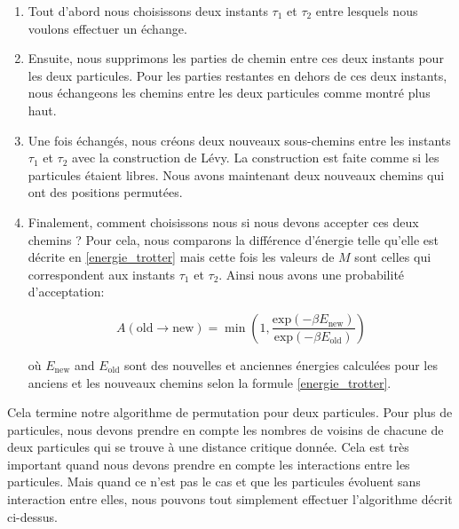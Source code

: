 \documentclass[11pt]{article}
\theoremstyle{definition}
\theoremstyle{remark}
\begin{document}
\begin{enumerate} 
\item 
Tout d'abord nous choisissons deux instants $\tau_1$ et $\tau_2$ entre lesquels nous voulons effectuer un échange. 
\item 
Ensuite, nous supprimons les parties de chemin entre ces deux instants pour les deux particules. Pour les parties restantes en dehors de ces deux instants, nous échangeons les chemins entre les deux particules comme montré plus haut. 
\item 
Une fois échangés, nous créons deux nouveaux sous-chemins entre les instants $\tau_1$ et $\tau_2$ avec la construction de Lévy. La construction est faite comme si les particules étaient libres. Nous avons maintenant deux nouveaux chemins qui ont des positions permutées. 
\item 
Finalement, comment choisissons nous si nous devons accepter ces deux chemins ? Pour cela, nous comparons la différence d'énergie telle qu'elle est décrite en \eqref{energie_trotter} mais cette fois les valeurs de $M$ sont celles qui correspondent aux instants $\tau_1$ et $\tau_2$. Ainsi nous avons une probabilité d'acceptation: 

\begin{equation}
\label{acceptance_levy} 
A(\mathrm{old}\rightarrow \mathrm{new}) = \min\left(1,\frac{\mathrm{exp}(-\beta E_{\mathrm{new}})}{\mathrm{exp}(-\beta E_{\mathrm{old}})}\right)
\end{equation}

où $E_\mathrm{new}$ and $E_\mathrm{old}$ sont des nouvelles et anciennes énergies calculées pour les anciens et les nouveaux chemins selon la formule \eqref{energie_trotter}. 
\end{enumerate}

Cela termine notre algorithme de permutation pour deux particules. Pour plus de particules, nous devons prendre en compte les nombres de voisins de chacune de deux particules qui se trouve à une distance critique donnée. Cela est très important quand nous devons prendre en compte les interactions entre les particules. Mais quand ce n'est pas le cas et que les particules évoluent sans interaction entre elles, nous pouvons tout simplement effectuer l'algorithme décrit ci-dessus. 
\end{document}
